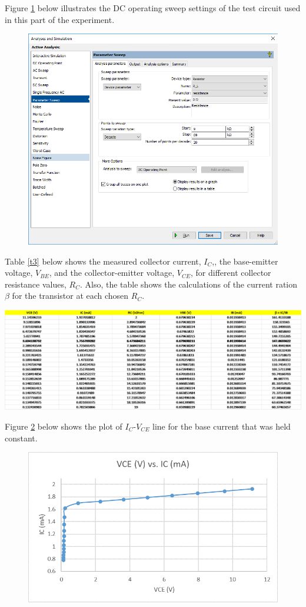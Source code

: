 \documentclass{article}
\begin{document}
	\noindent Figure \ref{f6} below illustrates the DC operating sweep settings of the test circuit used in this part of the experiment.

	\begin{figure}[!ht]
		\centering
		\includegraphics[width=0.55\linewidth]{d1-part2-DcOperatingSweep.png}
		\label{f6}
	\end{figure}	

	\noindent Table \ref{t3} below shows the measured collector current, $I_C$,, the base-emitter voltage, $V_{BE}$, and the collector-emitter voltage, $V_{CE}$, for different collector resistance values, $R_C$.
	Also, the table shows the calculations of the current ration $\beta$ for the transistor at each chosen $R_C$.

	\begin{table}[!ht]
		\centering
		\label{t3}
		\includegraphics[width=\textwidth]{part2-data-measured}	
	\end{table}	

	\noindent Figure \ref{f7} below shows the plot of $I_C$-$V_{CE}$ line for the base current that was held constant.
	\begin{figure}[!ht]
		\centering
		\includegraphics[width=0.8\linewidth]{vce_vs_ic.png}
		\label{f7}
	\end{figure}
\end{document}

